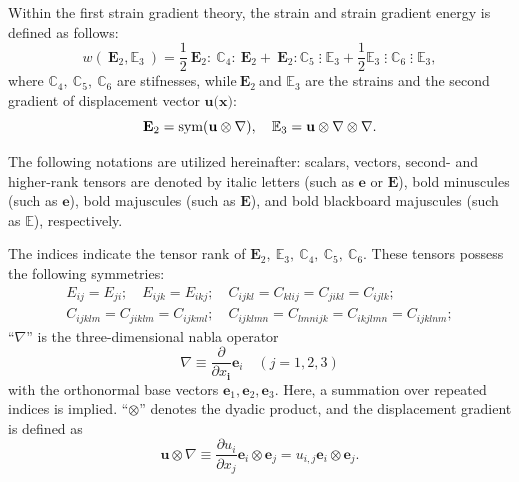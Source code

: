 Within the first strain gradient theory, the strain and strain gradient energy is defined as follows:
\begin{equation} \label{Chirkov_Eq_1_} 
	w\left({\ {\mathbf E}}_2,{{\mathbb E}}_3\ \right)=\frac{1}{2}{\ {\mathbf E}}_2:\ {{\mathbb C}}_4:{\ {\mathbf E}}_2+{\ {\mathbf E}}_2: {{\mathbb C}}_5\;\vdots\; {{\mathbb E}}_3+\frac{1}{2}{{\mathbb E}}_3\;\vdots\; {{\mathbb C}}_6\;\vdots\; {{\mathbb E}}_3,   
\end{equation} 
where ${{\mathbb C}}_4,\ {{\mathbb C}}_5,\ {{\mathbb C}}_6$ are stifnesses, while${\ {\mathbf E}}_2\ $and ${{\mathbb E}}_3$ are the strains and the second gradient of displacement vector ${\mathbf u}{\mathbf (}{\mathbf x}{\mathbf )}$:
\begin{equation} \label{Chirkov_Eq_2_} 
	{{\mathbf E}}_2={\rm sym(}{\mathbf u}\otimes \nabla {\rm )},\quad        {{\mathbb E}}_3={\mathbf u}\otimes \nabla \otimes \nabla .    
\end{equation} 

The following notations are utilized hereinafter: scalars, vectors, second- and higher-rank tensors are denoted by italic letters (such as ${\mathbf e}$ or ${\mathbf E}$), bold minuscules (such as ${\mathbf e}$), bold majuscules (such as ${\mathbf E}$), and bold blackboard majuscules (such as ${\mathbb E}$), respectively.

The indices indicate the tensor rank of ${{\mathbf E}}_2,\ {{\mathbb E}}_3,\ {{\mathbb C}}_4,\ {{\mathbb C}}_5,\ {{\mathbb C}}_6$. These tensors possess the following symmetries:
\begin{equation} \label{Chirkov_Eq_3_} 
	\begin{array}{l}
		E_{ij}=E_{ji};\quad  
		E_{ijk}=E_{ikj};\quad
		C_{ijkl}=C_{klij}=C_{jikl}=C_{ijlk};
		\\
		C_{ijklm}=C_{jiklm}=C_{ijkml};\quad  C_{ijklmn}=C_{lmnijk}=C_{ikjlmn}=C_{ijklnm};       
	\end{array}
\end{equation} 
``$\nabla $'' is the three-dimensional nabla operator
\begin{equation} \label{Chirkov_Eq_4_} 
	\nabla \equiv \frac{\partial }{\partial x_{{\mathbf i}}}{{\mathbf e}}_i\quad (j=1,2,3) 
\end{equation} 
with the orthonormal base vectors ${{\mathbf e}}_1,{{\mathbf e}}_2, {{\mathbf e}}_3$. Here, a summation over repeated indices is implied. ``$\otimes $'' denotes the dyadic product, and the displacement gradient is defined as
\begin{equation} \label{Chirkov_Eq_5_} 
	{\mathbf u}\otimes \nabla \equiv \frac{\partial u_i}{\partial x_j}{{\mathbf e}}_i\otimes {{\mathbf e}}_j=u_{i,j}{{\mathbf e}}_i\otimes {{\mathbf e}}_j. 
\end{equation} 

